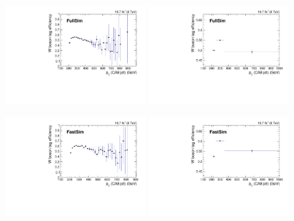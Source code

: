 \begin{figure}[htbp]
\centering
\includegraphics[width=0.48\textwidth]{figures/razor_wtag/Eff_ratio_tagged_all_FullSim_Thesis}
\includegraphics[width=0.48\textwidth]
{figures/razor_wtag/Eff_ratio_tagged_all_varbin_FullSim_Thesis}

\includegraphics[width=0.48\textwidth]{figures/razor_wtag/Eff_ratio_tagged_all_FastSim_Thesis}
\includegraphics[width=0.48\textwidth]
{figures/razor_wtag/Eff_ratio_tagged_all_varbin_FastSim_Thesis}


\end{figure}
